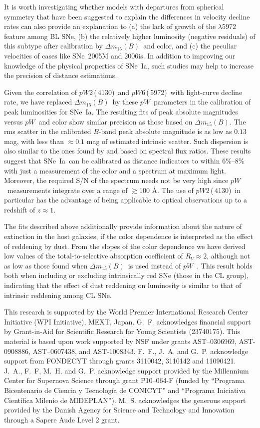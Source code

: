 \documentclass[apj]{emulateapj-rtx4}
\newcommand{\ew}{$pW$}
\newcommand{\pwtwo}{$pW$2\,(\ion{Si}{2}\,4130)}
\newcommand{\pwsix}{$pW$6\,(\ion{Si}{2}\,5972)}
\newcommand{\dm}{$\Delta m_{15}(B)$}
\newcommand{\sneia}{SNe~Ia}
\begin{document}
It is worth investigating whether models with departures from
spherical symmetry \citep[e.g.,][]{maeda10a} that have 
been suggested to explain the differences in velocity decline rates
\citep{maeda10b} can also provide an explanation to (a) the lack of growth
of the  $\lambda$5972 feature among BL SNe, (b) the
relatively higher luminosity (negative residuals) of this subtype
after calibration by \dm\ and color, and (c) the peculiar 
velocities of cases like SNe~2005M and 2006is. In addition to improving our
knowledge of the physical properties of \sneia, such studies may
help to increase the precision of distance estimations. 

Given the correlation of \pwtwo\ and \pwsix\ with light-curve decline rate, we
have replaced \dm\ by these \ew\ parameters in the calibration of peak
luminosities for \sneia. The resulting fits of peak absolute 
magnitudes versus \ew\ and color show similar precision as those
based on \dm. The rms scatter in the calibrated $B$-band peak absolute 
magnitude is as low as $0.13$ mag, with less than $\approx$$0.1$ mag of
estimated intrinsic scatter. Such dispersion is also similar to the
ones found by \citet{bailey09} and \citet{blondin11a} based on spectral
flux ratios. These results suggest that \sneia\ can be 
calibrated as distance indicators to within 6\%--8\% with just a
measurement of the color 
and a spectrum at maximum light. Moreover, the required S/N of the
spectrum needs not be very high since \ew\ measurements integrate over
a range of $\gtrsim$100 \AA. The use of \pwtwo\ in particular has the
advantage of being applicable to optical observations up to a redshift
of $z \approx 1$. 

The fits described above additionally provide information about the nature of 
extinction in the host galaxies, if the color dependence is interpreted
as the effect of reddening by dust. From the slopes of the color
dependence we have derived low values of the
total-to-selective absorption coefficient of $R_V \approx 2$, although
not as low as those found when \dm\ is used instead of
\ew\ \citep{folatelli10}. This result holds 
both when including or excluding intrinsically red SNe (those in the
CL group), indicating that the effect of dust reddening on luminosity
is similar to that of intrinsic reddening among CL SNe. 

\acknowledgments 

This research is supported by the World Premier International Research Center
Initiative (WPI Initiative), MEXT, Japan. G.~F. acknowledges financial
support by Grant-in-Aid for Scientific Research for Young Scientists
(23740175). This material is based upon work supported by NSF under  
grants AST--0306969, AST-0908886, AST--0607438, and AST-1008343. 
F.~F., J.~A. and G.~P. acknowledge support from FONDECYT through grants
3110042, 3110142 and 11090421. J.~A., F.~F, M.~H. and G.~P. acknowledge
support provided by the Millennium Center for Supernova Science through
grant P10--064-F (funded by “Programa Bicentenario de Ciencia y Tecnología
de CONICYT” and “Programa Iniciativa Científica Milenio de
MIDEPLAN”). M.~S. acknowledges the generous support provided by the
Danish Agency for Science and Technology and Innovation through a
Sapere Aude Level 2 grant. 
\end{document}
